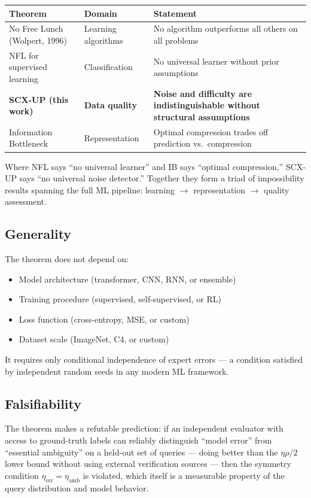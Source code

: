 \documentclass[12pt,a4paper]{article}
\theoremstyle{definition}
\theoremstyle{remark}
\begin{document}
\begin{table}[htbp]
\centering
\begin{tabular}{@{}lll@{}}
\toprule
Theorem & Domain & Statement \\
\midrule
No Free Lunch (Wolpert, 1996) & Learning algorithms & No algorithm outperforms all others on all problems \\
NFL for supervised learning & Classification & No universal learner without prior assumptions \\
\textbf{SCX-UP (this work)} & \textbf{Data quality} & \textbf{Noise and difficulty are indistinguishable without structural assumptions} \\
Information Bottleneck & Representation & Optimal compression trades off prediction vs.\ compression \\
\bottomrule
\end{tabular}
\end{table}

Where NFL says ``no universal learner'' and IB says ``optimal compression,'' SCX-UP says ``no universal noise detector.'' Together they form a triad of impossibility results spanning the full ML pipeline: learning $\to$ representation $\to$ quality assessment.

\subsection{Generality}

The theorem does not depend on:
\begin{itemize}
\item Model architecture (transformer, CNN, RNN, or ensemble)
\item Training procedure (supervised, self-supervised, or RL)
\item Loss function (cross-entropy, MSE, or custom)
\item Dataset scale (ImageNet, C4, or custom)
\end{itemize}

It requires only conditional independence of expert errors — a condition satisfied by independent random seeds in any modern ML framework.

\subsection{Falsifiability}

The theorem makes a refutable prediction: if an independent evaluator with access to ground-truth labels can reliably distinguish ``model error'' from ``essential ambiguity'' on a held-out set of queries — doing better than the $\eta\rho/2$ lower bound without using external verification sources — then the symmetry condition $\eta_{\text{err}} = \eta_{\text{amb}}$ is violated, which itself is a measurable property of the query distribution and model behavior.
\end{document}
